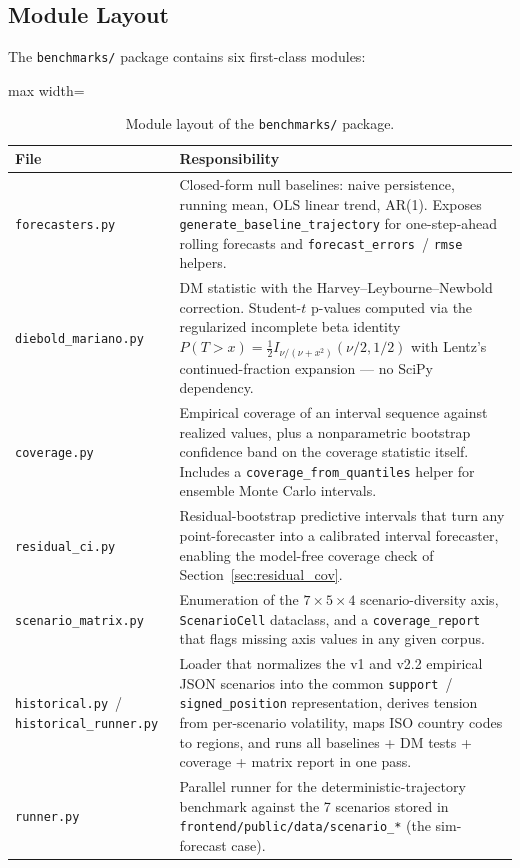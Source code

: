 \documentclass[12pt]{article}
\begin{document}
\subsection{Module Layout}
\label{app:repro_layout}

The \texttt{benchmarks/} package contains six first-class modules:

\begin{table}[H]
\centering
\caption{Module layout of the \texttt{benchmarks/} package.}
\label{tab:repro_modules}
\begin{adjustbox}{max width=\textwidth}
\begin{tabular}{@{}p{4cm}p{12cm}@{}}
\toprule
File & Responsibility \\
\midrule
\texttt{forecasters.py} & Closed-form null baselines: naive persistence, running mean, OLS linear trend, AR(1). Exposes \texttt{generate\_baseline\_trajectory} for one-step-ahead rolling forecasts and \texttt{forecast\_errors}~/ \texttt{rmse} helpers. \\
\texttt{diebold\_mariano.py} & DM statistic with the Harvey--Leybourne--Newbold correction. Student-$t$ p-values computed via the regularized incomplete beta identity $P(T > x) = \tfrac{1}{2} I_{\nu/(\nu+x^2)}(\nu/2, 1/2)$ with Lentz's continued-fraction expansion --- no SciPy dependency. \\
\texttt{coverage.py} & Empirical coverage of an interval sequence against realized values, plus a nonparametric bootstrap confidence band on the coverage statistic itself. Includes a \texttt{coverage\_from\_quantiles} helper for ensemble Monte Carlo intervals. \\
\texttt{residual\_ci.py} & Residual-bootstrap predictive intervals that turn any point-forecaster into a calibrated interval forecaster, enabling the model-free coverage check of Section~\ref{sec:residual_cov}. \\
\texttt{scenario\_matrix.py} & Enumeration of the $7 \times 5 \times 4$ scenario-diversity axis, \texttt{ScenarioCell} dataclass, and a \texttt{coverage\_report} that flags missing axis values in any given corpus. \\
\texttt{historical.py}~/ \texttt{historical\_runner.py} & Loader that normalizes the v1 and v2.2 empirical JSON scenarios into the common \texttt{support}~/ \texttt{signed\_position} representation, derives tension from per-scenario volatility, maps ISO country codes to regions, and runs all baselines + DM tests + coverage + matrix report in one pass. \\
\texttt{runner.py} & Parallel runner for the deterministic-trajectory benchmark against the 7 scenarios stored in \texttt{frontend/public/data/scenario\_*} (the sim-forecast case). \\
\bottomrule
\end{tabular}
\end{adjustbox}
\end{table}
\end{document}
